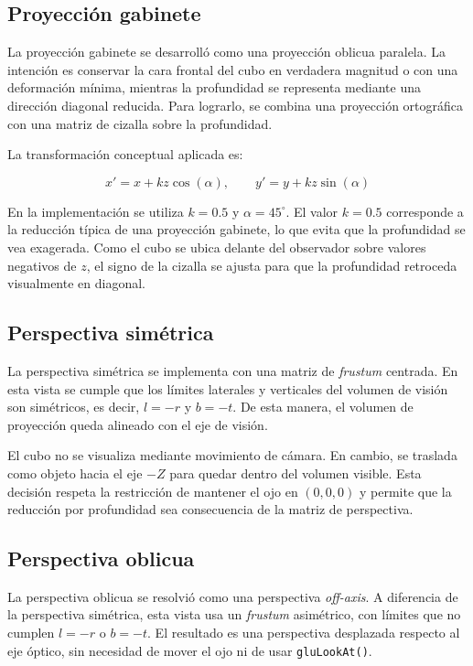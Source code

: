 \documentclass[12pt,a4paper]{article}
\begin{document}
\subsection{Proyección gabinete}

La proyección gabinete se desarrolló como una proyección oblicua paralela. La intención es conservar la cara frontal del cubo en verdadera magnitud o con una deformación mínima, mientras la profundidad se representa mediante una dirección diagonal reducida. Para lograrlo, se combina una proyección ortográfica con una matriz de cizalla sobre la profundidad.

La transformación conceptual aplicada es:

\[
    x' = x + k z \cos(\alpha), \qquad
    y' = y + k z \sin(\alpha)
\]

En la implementación se utiliza $k = 0.5$ y $\alpha = 45^\circ$. El valor $k=0.5$ corresponde a la reducción típica de una proyección gabinete, lo que evita que la profundidad se vea exagerada. Como el cubo se ubica delante del observador sobre valores negativos de $z$, el signo de la cizalla se ajusta para que la profundidad retroceda visualmente en diagonal.

\subsection{Perspectiva simétrica}

La perspectiva simétrica se implementa con una matriz de \emph{frustum} centrada. En esta vista se cumple que los límites laterales y verticales del volumen de visión son simétricos, es decir, $l=-r$ y $b=-t$. De esta manera, el volumen de proyección queda alineado con el eje de visión.

El cubo no se visualiza mediante movimiento de cámara. En cambio, se traslada como objeto hacia el eje $-Z$ para quedar dentro del volumen visible. Esta decisión respeta la restricción de mantener el ojo en $(0,0,0)$ y permite que la reducción por profundidad sea consecuencia de la matriz de perspectiva.

\subsection{Perspectiva oblicua}

La perspectiva oblicua se resolvió como una perspectiva \emph{off-axis}. A diferencia de la perspectiva simétrica, esta vista usa un \emph{frustum} asimétrico, con límites que no cumplen $l=-r$ o $b=-t$. El resultado es una perspectiva desplazada respecto al eje óptico, sin necesidad de mover el ojo ni de usar \texttt{gluLookAt()}.
\end{document}
